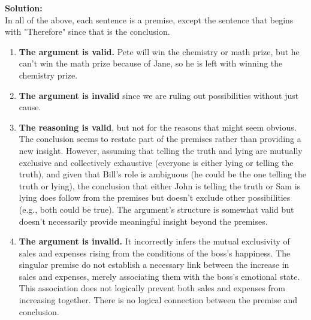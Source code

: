 \textbf{Solution:} \\
In all of the above, each sentence is a premise, except the sentence that begins with "Therefore" since that is the conclusion.
\begin{enumerate}[label=(\alph*)]
    \item \textbf{The argument is valid.} Pete will win the chemistry or math prize, but he can't win the math prize because of Jane, so he is left with winning the chemistry prize.
    
    \item \textbf{The argument is invalid} since we are ruling out possibilities without just cause.
    
    \item \textbf{The reasoning is valid}, but not for the reasons that might seem obvious. The conclusion seems to restate part of the premises rather than providing a new insight. However, assuming that telling the truth and lying are mutually exclusive and collectively exhaustive (everyone is either lying or telling the truth), and given that Bill's role is ambiguous (he could be the one telling the truth or lying), the conclusion that either John is telling the truth or Sam is lying does follow from the premises but doesn't exclude other possibilities (e.g., both could be true). The argument's structure is somewhat valid but doesn't necessarily provide meaningful insight beyond the premises.
    
    \item \textbf{The argument is invalid.} It incorrectly infers the mutual exclusivity of sales and expenses rising from the conditions of the boss's happiness. The singular premise do not establish a necessary link between the increase in sales and expenses, merely associating them with the boss's emotional state. This association does not logically prevent both sales and expenses from increasing together. There is no logical connection between the premise and conclusion.
\end{enumerate}